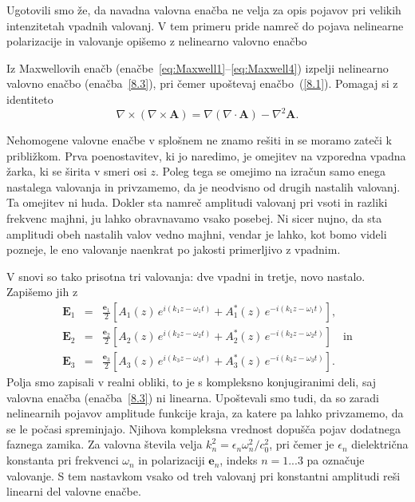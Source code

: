 Ugotovili smo že, da navadna valovna enačba ne velja za opis pojavov pri velikih 
intenzitetah vpadnih valovanj. V tem primeru pride namreč  do pojava
nelinearne polarizacije in valovanje opišemo z nelinearno valovno 
enačbo

\begin{definition}
Iz Maxwellovih enačb (enačbe~\ref{eq:Maxwell1}--\ref{eq:Maxwell4}) izpelji 
nelinearno valovno enačbo (enačba~\ref{8.3}), pri čemer upoštevaj enačbo~(\ref{8.1}). 
Pomagaj si z identiteto
$$
\nabla \times (\nabla \times \mathbf{A}) = \nabla (\nabla \cdot \mathbf{A}) 
- \nabla^2 \mathbf{A}.
$$
\end{definition} 

Nehomogene valovne enačbe v splošnem ne znamo rešiti in se moramo zateči k približkom.
Prva poenostavitev, ki jo naredimo, je omejitev na vzporedna vpadna žarka,
ki se širita v smeri osi $z$. Poleg tega se omejimo na izračun samo enega
nastalega valovanja in privzamemo, da je neodvisno od drugih nastalih valovanj.
Ta omejitev ni huda. Dokler sta namreč amplitudi valovanj pri vsoti in razliki
frekvenc majhni, ju lahko obravnavamo vsako posebej. Ni sicer nujno,
da sta amplitudi obeh nastalih valov vedno majhni, vendar je lahko, kot bomo videli 
pozneje, le eno valovanje naenkrat po jakosti primerljivo z vpadnim. 

V snovi so tako prisotna tri valovanja:
dve vpadni in tretje, novo nastalo. Zapišemo jih z 
\begin{eqnarray}
\mathbf{E}_{1} & = & \frac{\mathbf{e}_{1}}{2}\left[A_{1}(z)\, 
e^{i(k_{1}z-\omega_{1}t)}+A_{1}^{*}(z)\, e^{-i(k_{1}z-\omega_{1}t)}\right],\nonumber \\
\mathbf{E}_{2} & = & \frac{\mathbf{e}_{2}}{2}\left[A_{2}(z)\, 
e^{i(k_{2}z-\omega_{2}t)}+A_{2}^{*}(z)\, e^{-i(k_{2}z-\omega_{2}t)}\right] \quad \mathrm{in} \nonumber \\
\mathbf{E}_{3} & = & \frac{\mathbf{e}_{3}}{2}\left[A_{3}(z)\, 
e^{i(k_{3}z-\omega_{3}t)}+A_{3}^{*}(z)\, e^{-i(k_{3}z-\omega_{3}t)}\right].
\end{eqnarray}
Polja smo zapisali v realni obliki, to je s kompleksno konjugiranimi
deli, saj valovna enačba (enačba~\ref{8.3}) ni linearna. Upoštevali smo tudi,
da so zaradi nelinearnih pojavov amplitude funkcije kraja, za
katere pa lahko privzamemo, da se le počasi spreminjajo. Njihova kompleksna vrednost
dopušča pojav dodatnega faznega zamika. Za valovna
števila velja $k_{n}^{2}=\epsilon_{n}\omega_n^{2}/c_0^{2}$,
pri čemer je $\epsilon_{n}$ dielektrična konstanta pri frekvenci
$\omega_{n}$ in polarizaciji $\mathbf{e}_{n}$, indeks $n = 1...3$ pa označuje
valovanje. S tem nastavkom vsako od treh valovanj
pri konstantni amplitudi reši linearni del valovne enačbe. 

